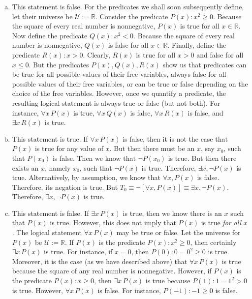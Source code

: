 \documentclass[11pt,letterpaper]{article}
\begin{document}
\sol 
\begin{enumerate}[(a)]
\item This statement is false. For the predicates we shall soon subsequently define, let their universe be $\mathcal{U}:= \mathbb{R}$. Consider the predicate $P(x) \colon x^2 \geq 0$. Because the square of every real number is nonnegative, $P(x)$ is true for all $x \in \mathbb{R}$. Now define the predicate $Q(x) \colon x^2 < 0$. Because the square of every real number is nonnegative, $Q(x)$ is false for all $x \in \mathbb{R}$. Finally, define the predicate $R(x) \colon x > 0$. Clearly, $R(x)$ is true for all $x > 0$ and false for all $x \leq 0$. But the predicates $P(x), Q(x), R(x)$ show us that predicates can be true for all possible values of their free variables, always false for all possible values of their free variables, or can be true or false depending on the choice of the free variables. However, once we quantify a predicate, the resulting logical statement is always true or false (but not both). For instance, $\forall x\, P(x)$ is true, $\forall x\, Q(x)$ is false, $\forall x\, R(x)$ is false, and $\exists x\, R(x)$ is true. \pspace

\item This statement is true. If $\forall x\, P(x)$ is false, then it is not the case that $P(x)$ is true for any value of $x$. But then there must be an $x$, say $x_0$, such that $P(x_0)$ is false. Then we know that $\neg P(x_0)$ is true. But then there exists an $x$, namely $x_0$, such that $\neg P(x)$ is true. Therefore, $\exists x, \neg P(x)$ is true. Alternatively, by assumption, we know that $\forall x, P(x)$ is false. Therefore, its negation is true. But $T_0 \equiv \neg [ \forall x, P(x)] \equiv \exists x, \neg P(x)$. Therefore, $\exists x, \neg P(x)$ is true. \pspace

\item This statement is false. If $\exists x\, P(x)$ is true, then we know there is an $x$ such that $P(x)$ is true. However, this does not imply that $P(x)$ is true \textit{for all} $x$. The logical statement $\forall x\, P(x)$ may be true or false. Let the universe for $P(x)$ be $\mathcal{U}:= \mathbb{R}$. If $P(x)$ is the predicate $P(x) \colon x^2 \geq 0$, then certainly $\exists x\, P(x)$ is true. For instance, if $x= 0$, then $P(0) \colon 0= 0^2 \geq 0$ is true. Moreover, it is the case (as we have described above) that $\forall x\, P(x)$ is true because the square of any real number is nonnegative. However, if $P(x)$ is the predicate $P(x) \colon x \geq 0$, then $\exists x\, P(x)$ is true because $P(1) \colon 1= 1^2 > 0$ is true. However, $\forall x\, P(x)$ is false. For instance, $P(-1) \colon -1 \geq 0$ is false. 
\end{enumerate}
\end{document}
